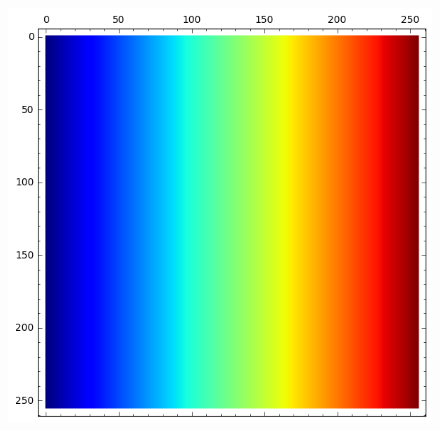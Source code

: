 \documentclass[12pt,a4paper]{article}
\begin{document}
\begin{figure}[!hb]
\begin{minipage}{.48\textwidth}
\includegraphics[width=.9\linewidth]{../matrix_plot/cast128_1_0_bent_cayley_graph_index_matrix.png}
  \label{fig:cast128_1_0_bent_cayley_graph_index_matrix}
\end{minipage}%
\end{figure}
\end{document}
